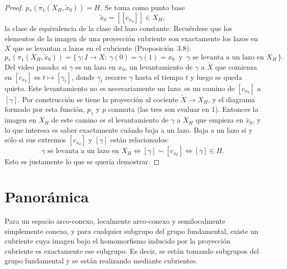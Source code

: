 \documentclass[11pt]{article}
\begin{document}
\begin{proof}
\medskip\noindent\emph{$p_*(\pi_1(X_H,\tilde x_0))=H$.} Se toma como punto base
\[
  \tilde x_0=[[c_{x_0}]]\in X_H ,
\]
la clase de equivalencia de la clase del lazo constante. Recuérdese que los elementos de la imagen de una proyección cubriente son exactamente los lazos en $X$ que se levantan a lazos en el cubriente (Proposición~3.8):
\[
  p_*(\pi_1(X_H,\tilde x_0))=\{\,\gamma\colon I\to X:\ \gamma(0)=\gamma(1)=x_0\ \text{ y }\ \gamma\text{ se levanta a un lazo en }X_H\,\}.
\]
Del video pasado: si $\gamma$ es un lazo en $x_0$, un levantamiento de $\gamma$ a $\tilde X$ que comienza en $[c_{x_0}]$ es $t\mapsto[\gamma_t]$, donde $\gamma_t$ recorre $\gamma$ hasta el tiempo $t$ y luego se queda quieto. Este levantamiento no es necesariamente un lazo: es un camino de $[c_{x_0}]$ a $[\gamma]$. Por construcción se tiene la proyección al cociente $\tilde X\to X_H$, y el diagrama formado por esta función, $p_1$ y $p$ conmuta (las tres son evaluar en $1$). Entonces la imagen en $X_H$ de este camino es el levantamiento de $\gamma$ a $X_H$ que empieza en $\tilde x_0$, y lo que interesa es saber exactamente cuándo baja a un lazo. Baja a un lazo si y sólo si sus extremos $[c_{x_0}]$ y $[\gamma]$ están relacionados:
\[
  \gamma\text{ se levanta a un lazo en }X_H\iff[\gamma]\sim[c_{x_0}]\iff[\gamma]\in H .
\]
Esto es justamente lo que se quería demostrar.
\end{proof}

\section*{Panorámica}

Para un espacio arco-conexo, localmente arco-conexo y semilocalmente simplemente conexo, y para cualquier subgrupo del grupo fundamental, existe un cubriente cuya imagen bajo el homomorfismo inducido por la proyección cubriente es exactamente ese subgrupo. Es decir, se están tomando subgrupos del grupo fundamental y se están realizando mediante cubrientes.
\end{document}
